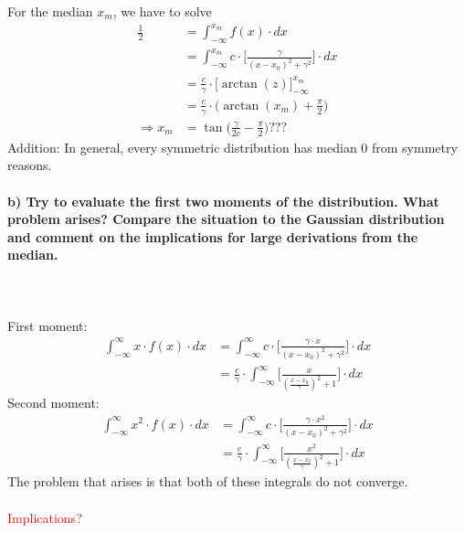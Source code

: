     For the median $x_m$, we have to solve
    \begin{align}
        \frac{1}{2}
        &=\int_{-\infty}^{x_m}f(x)\cdot dx \\
        &=\int_{-\infty}^{x_m}c\cdot\bigg[
            \frac{\gamma}{(x-x_0)^2+\gamma^2}
        \bigg]\cdot dx \\
        &=\frac{c}{\gamma}\cdot\bigg[\arctan(z)\bigg]^{x_m}_{-\infty} \\
        &=\frac{c}{\gamma}\cdot\bigg(\arctan(x_m)+\frac{\pi}{2}\bigg) \\
        \Rightarrow x_m
        &=\tan\bigg({\frac{\gamma}{2c}-\frac{\pi}{2}}\bigg) ???
    \end{align}
    Addition: In general, every symmetric distribution has median 0 from symmetry reasons.


\paragraph{b) Try to evaluate the first two moments of the distribution.
    What problem arises? Compare the situation to the Gaussian 
    distribution and comment on the implications for large derivations
    from the median.
} \ \\
\\
    First moment:
    \begin{align}
        \int_{-\infty}^\infty x\cdot f(x)\cdot dx
        &=\int_{-\infty}^\infty c\cdot\bigg[
            \frac{\gamma\cdot x}{(x-x_0)^2+\gamma^2}
        \bigg]\cdot dx \\
        &=\frac{c}{\gamma}\cdot\int_{-\infty}^\infty\bigg[
            \frac{x}{(\frac{x-x_0}{\gamma})^2+1}
        \bigg]\cdot dx
    \end{align}
    Second moment:
    \begin{align}
        \int_{-\infty}^\infty x^2\cdot f(x)\cdot dx
        &=\int_{-\infty}^\infty c\cdot\bigg[
            \frac{\gamma\cdot x^2}{(x-x_0)^2+\gamma^2}
        \bigg]\cdot dx \\
        &=\frac{c}{\gamma}\cdot\int_{-\infty}^\infty\bigg[
            \frac{x^2}{(\frac{x-x_0}{\gamma})^2+1}
        \bigg]\cdot dx
    \end{align}
    The problem that arises is that both of these integrals do not converge. \\
    \\
    \textcolor{red}{Implications?}

